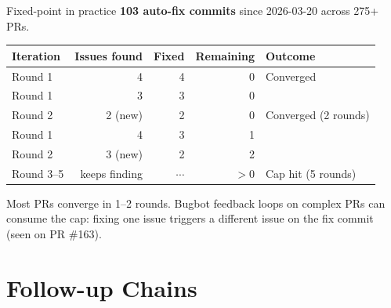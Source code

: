 \documentclass[aspectratio=169,10pt]{beamer}
\begin{document}
\begin{frame}{Fixed-point in practice}
    \vspace{-0.2em}
    \textcolor{leangreen}{\textbf{103 auto-fix commits}} since 2026-03-20 across 275+ PRs.
    \vspace{0.3em}

    \begin{center}
    \renewcommand{\arraystretch}{1.15}
    {\footnotesize
    \begin{tabular}{@{}l r r r l@{}}
        \toprule
        \textbf{Iteration} & \textbf{Issues found} & \textbf{Fixed} & \textbf{Remaining} & \textbf{Outcome} \\
        \midrule
        Round 1 & 4 & 4 & 0 & \textcolor{leangreen}{Converged} \\
        \midrule
        Round 1 & 3 & 3 & 0 & \\
        Round 2 & 2 (new) & 2 & 0 & \textcolor{leangreen}{Converged (2 rounds)} \\
        \midrule
        Round 1 & 4 & 3 & 1 & \\
        Round 2 & 3 (new) & 2 & 2 & \\
        Round 3--5 & keeps finding & $\cdots$ & $>0$ & \textcolor{softred}{Cap hit (5 rounds)} \\
        \bottomrule
    \end{tabular}
    }
    \end{center}
    \vspace{0.4em}
    \textcolor{dimwhite}{\footnotesize Most PRs converge in 1--2 rounds. Bugbot feedback loops on complex PRs can consume the cap: fixing one issue triggers a different issue on the fix commit (seen on PR \#163).}
\end{frame}

\section{Follow-up Chains}
\end{document}
